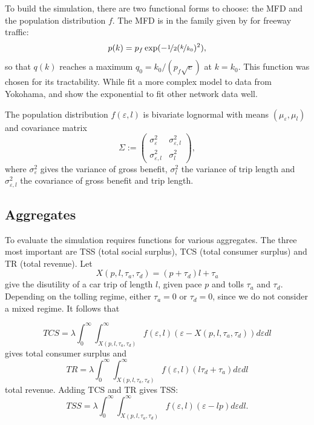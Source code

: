\documentclass[preprint,authoryear]{elsarticle}
\newcommand{\taud}{\tau_d}
\newcommand{\taua}{\tau_a}
\newcommand{\ve}{\varepsilon}
\begin{document}
To build the simulation, there are two functional forms to choose: the MFD and the population distribution $f$. The MFD is in the family given by \citet{Drake1967a} for freeway traffic: 
\begin{equation}
	p(k) = p_f \exp(-\nicefrac{1}{2}(\nicefrac{k}{k_0})^{2}),
\end{equation}
so that $q(k)$ reaches a maximum $q_0=k_0/(p_f\sqrt{e})$ at $k=k_0$. This function was chosen for its tractability. While \citet{Daganzo2012} fit a more complex model to data from Yokohama, \citet{Olszewski1995} and \citet{Williams1987a} show the exponential to fit other network data well.

The population distribution $f(\ve,l)$ is bivariate lognormal with means $(\mu_\ve, \mu_l)$ and covariance matrix 
$$
\Sigma := \begin{pmatrix}
	\sigma^2_\ve & \sigma^2_{\ve,l} \\
	\sigma^2_{\ve,l} & \sigma^2_l
\end{pmatrix},
$$
where $\sigma^2_\ve$ gives the variance of gross benefit, $\sigma^2_l$ the variance of trip length and $\sigma^2_{\ve,l}$ the covariance of gross benefit and trip length.

\subsection{Aggregates}
\label{ssec:aggregates}

To evaluate the simulation requires functions for various aggregates. The three most important are TSS (total social surplus), TCS (total consumer surplus) and TR (total revenue). Let 
\begin{equation}
	X(p,l,\taua,\taud) = (p+\taud)l + \taua
\end{equation}
give the disutility of a car trip of length $l$, given pace $p$ and tolls $\taua$ and $\taud$. Depending on the tolling regime, either $\taua=0$  or $\taud=0$, since we do not consider a mixed regime. It follows that

\begin{equation}
	TCS = \lambda \int_0^{\infty} \int_{X(p,l,\taua,\taud)}^\infty f(\ve, l)(\varepsilon-X(p,l,\taua,\taud)) d\ve dl
\end{equation}
gives total consumer surplus and
\begin{equation}
	TR = \lambda \int_0^{\infty} \int_{X(p,l,\taua,\taud)}^\infty f(\ve, l)(l\taud + \taua) d\ve dl
\end{equation}
total revenue. Adding TCS and TR gives TSS:
\begin{equation}
	TSS = \lambda \int_0^{\infty} \int_{X(p,l,\taua,\taud)}^\infty f(\ve, l)( \ve - lp) d\ve dl.
\end{equation}
\end{document}
